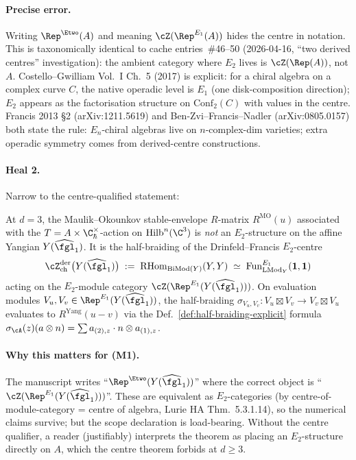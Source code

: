 \paragraph{Precise error.}  Writing $\Rep^{\Etwo}(A)$ and meaning
$\cZ(\Rep^{E_1}(A))$ hides the centre in notation.  This is
taxonomically identical to cache entries~\#46--50 (2026-04-16, ``two
derived centres'' investigation): the ambient category where $E_2$
lives is $\cZ(\Rep(A))$, not $A$.  Costello--Gwilliam Vol.~I Ch.~5
(2017) is explicit: for a chiral algebra on a complex curve $C$, the
native operadic level is $E_1$ (one disk-composition direction);
$E_2$ appears as the factorisation structure on
$\mathrm{Conf}_2(C)$ with values in the centre.  Francis 2013 \S2
(arXiv:1211.5619) and Ben-Zvi--Francis--Nadler (arXiv:0805.0157) both
state the rule: $E_n$-chiral algebras live on $n$-complex-dim
varieties; extra operadic symmetry comes from derived-centre
constructions.

\paragraph{Heal 2.}  Narrow to the centre-qualified statement:

\begin{theorem}
\label{thm:MO-E2-heal-centre}
At $d = 3$, the Maulik--Okounkov stable-envelope $R$-matrix
$R^{\mathrm{MO}}(u)$ associated with the
$T = A\times\C^\times_\hbar$-action on $\mathrm{Hilb}^n(\C^3)$ is
\emph{not} an $E_2$-structure on the affine Yangian
$Y(\widehat{\fgl}_1)$.  It is the half-braiding of the
Drinfeld--Francis $E_2$-centre
\[
\cZ^{\mathrm{der}}_{\mathrm{ch}}\bigl(Y(\widehat{\fgl}_1)\bigr)
 \;:=\;\operatorname{RHom}_{\operatorname{BiMod}(Y)}(Y, Y)
 \;\simeq\;\operatorname{Fun}^{E_1}_{\operatorname{LMod}_Y}(\mathbf 1, \mathbf 1)
\]
acting on the $E_2$-module category $\cZ(\Rep^{E_1}(Y(\widehat{\fgl}_1)))$.
On evaluation modules $V_u, V_v \in \Rep^{E_1}(Y(\widehat{\fgl}_1))$,
the half-braiding
$\sigma_{V_u, V_v}\colon V_u\boxtimes V_v\to V_v\boxtimes V_u$
evaluates to $R^{\mathrm{Yang}}(u-v)$ via the Def.~\ref{def:half-braiding-explicit}
formula
$\sigma_\cA(z)(a\otimes n) = \sum a_{(2),z}\cdot n\otimes a_{(1),z}$.
\end{theorem}

\paragraph{Why this matters for (M1).}  The manuscript writes
``$\Rep^{\Etwo}(Y(\widehat{\fgl}_1))$'' where the correct object is
``$\cZ(\Rep^{E_1}(Y(\widehat{\fgl}_1)))$''.  These are equivalent as
$E_2$-categories (by centre-of-module-category = centre of algebra,
Lurie HA Thm.~5.3.1.14), so the numerical claims survive; but the
scope declaration is load-bearing.  Without the centre qualifier, a
reader (justifiably) interprets the theorem as placing an
$E_2$-structure directly on $A$, which the centre theorem forbids at
$d \geq 3$.

